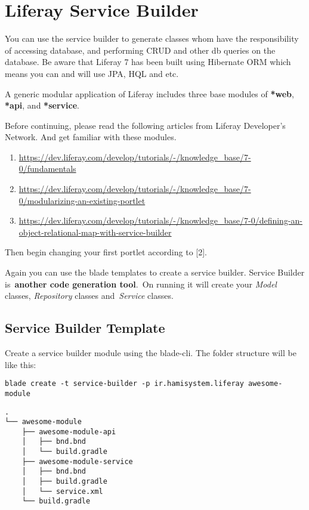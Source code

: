 \section{Liferay Service Builder}
You can use the service builder to generate classes whom have the responsibility of accessing database, and performing CRUD and other db queries on the database. Be aware that Liferay 7 has been built using Hibernate ORM which means you can and will use JPA, HQL and etc.

A generic modular application of Liferay includes three base modules of \textbf{*web}, \textbf{*api}, and \textbf{*service}.

Before continuing, please read the following articles from Liferay Developer's Network. And get familiar with these modules.
\begin{enumerate}
    \item \url{https://dev.liferay.com/develop/tutorials/-/knowledge_base/7-0/fundamentals}
    \item \url{https://dev.liferay.com/develop/tutorials/-/knowledge_base/7-0/modularizing-an-existing-portlet}
    \item \url{https://dev.liferay.com/develop/tutorials/-/knowledge_base/7-0/defining-an-object-relational-map-with-service-builder}
\end{enumerate}

Then begin changing your first portlet according to [2].

Again you can use the blade templates to create a service builder. Service Builder is \textbf{another code generation tool}. On running it will create your \textit{Model} classes, \textit{Repository} classes and \textit{Service} classes.
\subsection{Service Builder Template}
Create a service builder module using the blade-cli. The folder structure will be like this:

\lstset{language=bash}
\begin{lstlisting}
blade create -t service-builder -p ir.hamisystem.liferay awesome-module
\end{lstlisting}

\lstset{language=bash}
\begin{minipage}{\linewidth}
\begin{lstlisting}[caption=Folder Structure]
.
└── awesome-module
    ├── awesome-module-api
    │   ├── bnd.bnd
    │   └── build.gradle
    ├── awesome-module-service
    │   ├── bnd.bnd
    │   ├── build.gradle
    │   └── service.xml
    └── build.gradle
\end{lstlisting}
\end{minipage}

